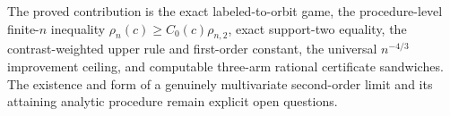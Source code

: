 The proved contribution is the exact labeled-to-orbit game, the procedure-level finite-\(n\) inequality \(\rho_n(c)\geq C_0(c)\rho_{n,2}\), exact support-two equality, the contrast-weighted upper rule and first-order constant, the universal \(n^{-4/3}\) improvement ceiling, and computable three-arm rational certificate sandwiches.  The existence and form of a genuinely multivariate second-order limit and its attaining analytic procedure remain explicit open questions.